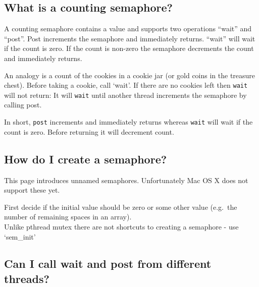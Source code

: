 \subsection{What is a counting
semaphore?}\label{what-is-a-counting-semaphore}

A counting semaphore contains a value and supports two operations
``wait'' and ``post''. Post increments the semaphore and immediately
returns. ``wait'' will wait if the count is zero. If the count is
non-zero the semaphore decrements the count and immediately returns.

An analogy is a count of the cookies in a cookie jar (or gold coins in
the treasure chest). Before taking a cookie, call `wait'. If there are
no cookies left then \texttt{wait} will not return: It will
\texttt{wait} until another thread increments the semaphore by calling
post.

In short, \texttt{post} increments and immediately returns whereas
\texttt{wait} will wait if the count is zero. Before returning it will
decrement count.

\subsection{How do I create a
semaphore?}\label{how-do-i-create-a-semaphore}

This page introduces unnamed semaphores. Unfortunately Mac OS X does not
support these yet.

First decide if the initial value should be zero or some other value
(e.g.~the number of remaining spaces in an array).\\Unlike pthread mutex
there are not shortcuts to creating a semaphore - use `sem\_init'

\begin{Shaded}
\begin{Highlighting}[]
 
  \NormalTok{, }\NormalTok{); }
\end{Highlighting}
\end{Shaded}

\subsection{Can I call wait and post from different
threads?}\label{can-i-call-wait-and-post-from-different-threads}

